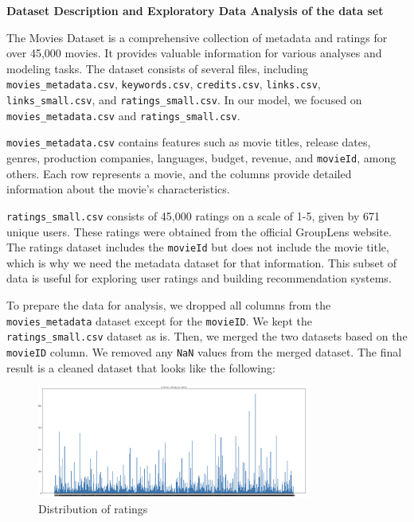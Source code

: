 \documentclass[11pt]{article}
\begin{document}
\vspace{0.5cm}

    \begin{flushleft}
        \textbf{\LARGE Dataset Description and Exploratory Data Analysis of the data set}
    \end{flushleft}


The Movies Dataset is a comprehensive collection of metadata and ratings for over 45,000 movies. It provides valuable information for various analyses and modeling tasks. The dataset consists of several files, including \texttt{movies\_metadata.csv}, \texttt{keywords.csv}, \texttt{credits.csv}, \texttt{links.csv}, \texttt{links\_small.csv}, and \texttt{ratings\_small.csv}. In our model, we focused on \texttt{movies\_metadata.csv} and \texttt{ratings\_small.csv}.

\vspace{0.3cm}

\texttt{movies\_metadata.csv} contains features such as movie titles, release dates, genres, production companies, languages, budget, revenue, and \texttt{movieId}, among others. Each row represents a movie, and the columns provide detailed information about the movie's characteristics.

\vspace{0.3cm}

\texttt{ratings\_small.csv} consists of 45,000 ratings on a scale of 1-5, given by 671 unique users. These ratings were obtained from the official GroupLens website. The ratings dataset includes the \texttt{movieId} but does not include the movie title, which is why we need the metadata dataset for that information. This subset of data is useful for exploring user ratings and building recommendation systems.

\vspace{0.3cm}

To prepare the data for analysis, we dropped all columns from the \texttt{movies\_metadata} dataset except for the \texttt{movieID}. We kept the \texttt{ratings\_small.csv} dataset as is. Then, we merged the two datasets based on the \texttt{movieID} column. We removed any \texttt{NaN} values from the merged dataset. The final result is a cleaned dataset that looks like the following: 

\vspace{0.3cm}

\begin{figure}[H]
  \centering
  \includegraphics[width=0.8\textwidth]{image/ratings.png}
  \caption{Distribution of ratings}
\end{figure}
\end{document}
